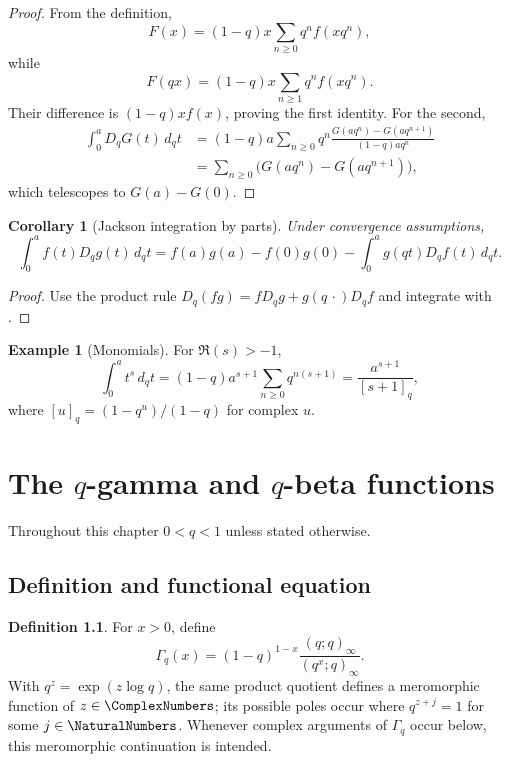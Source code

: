 \documentclass[11pt,a4paper,oneside,openany]{book}
\newtheorem{corollary}[corollary]{Corollary}
\theoremstyle{definition}
\newtheorem{definition}[definition]{Definition}
\newtheorem{example}[example]{Example}
\theoremstyle{remark}
\begin{document}
\begin{proof}
From the definition,
\[
 F(x)=(1-q)x\sum_{n\ge0}q^nf(xq^n),
\]
while
\[
 F(qx)=(1-q)x\sum_{n\ge1}q^nf(xq^n).
\]
Their difference is $(1-q)xf(x)$, proving the first identity.  For the second,
\begin{align*}
 \int_0^aD_qG(t)\,d_qt
 &=(1-q)a\sum_{n\ge0}q^n
 \frac{G(aq^n)-G(aq^{n+1})}{(1-q)aq^n}\\
 &=\sum_{n\ge0}\bigl(G(aq^n)-G(aq^{n+1})\bigr),
\end{align*}
which telescopes to $G(a)-G(0)$.
\end{proof}

\begin{corollary}[Jackson integration by parts]\label{cor:q-integration-parts}
Under convergence assumptions,
\[
 \int_0^a f(t)D_qg(t)\,d_qt
 =f(a)g(a)-f(0)g(0)
 -\int_0^a g(qt)D_qf(t)\,d_qt.
\]
\end{corollary}

\begin{proof}
Use the product rule
\(
 D_q(fg)=fD_qg+g(q\,\cdot)D_qf
\)
and integrate with .
\end{proof}

\begin{example}[Monomials]
For $\Re(s)>-1$,
\[
 \int_0^a t^s\,d_qt
 =(1-q)a^{s+1}\sum_{n\ge0}q^{n(s+1)}
 =\frac{a^{s+1}}{[s+1]_q},
\]
where $[u]_q=(1-q^u)/(1-q)$ for complex $u$.
\end{example}

\chapter{The \texorpdfstring{$q$}{q}-gamma and \texorpdfstring{$q$}{q}-beta functions}\label{chap:qgamma}

Throughout this chapter $0<q<1$ unless stated otherwise.

\section{Definition and functional equation}

\begin{definition}
For $x>0$, define
\[
 \Gamma_q(x)
 =(1-q)^{1-x}\frac{(q;q)_\infty}{(q^x;q)_\infty}.
\]
With $q^z=\exp(z\log q)$, the same product quotient defines a
meromorphic function of $z\in\ComplexNumbers$; its possible poles occur where
$q^{z+j}=1$ for some $j\in\NaturalNumbers$.  Whenever complex arguments of
$\Gamma_q$ occur below, this meromorphic continuation is intended.
\end{definition}
\end{document}
